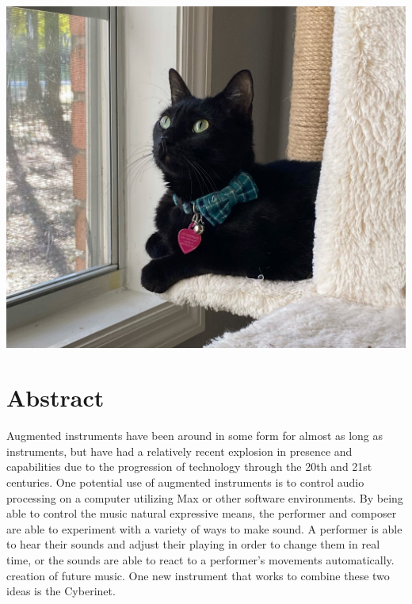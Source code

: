 \vspace{25mm}
\begin{center}
    \includegraphics[scale=0.2]{bean.jpeg}
\end{center}

\tableofcontents

 \listoffigures
 \listoftables

\chapter{Abstract}


Augmented instruments have been around in some form for almost as long as instruments, but have had a relatively recent explosion in presence and capabilities due to the progression of technology through the 20th and 21st centuries. One potential use of augmented instruments is to control audio processing on a computer utilizing Max or other software environments. By being able to control the music natural expressive means, the performer and composer are able to experiment with a variety of ways to make sound. A performer is able to hear their sounds and adjust their playing in order to change them in real time, or the sounds are able to react to a performer's movements automatically. creation of future music. One new instrument that works to combine these two ideas is the Cyberinet.

